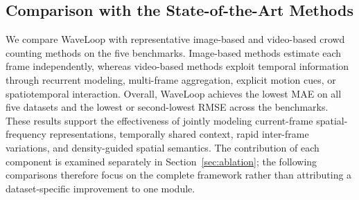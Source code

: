 \documentclass[lettersize,journal]{IEEEtran}
\begin{document}
\subsection{Comparison with the State-of-the-Art Methods}
We compare WaveLoop with representative image-based and video-based crowd counting methods on the five benchmarks. Image-based methods estimate each frame independently, whereas video-based methods exploit temporal information through recurrent modeling, multi-frame aggregation, explicit motion cues, or spatiotemporal interaction. Overall, WaveLoop achieves the lowest MAE on all five datasets and the lowest or second-lowest RMSE across the benchmarks. These results support the effectiveness of jointly modeling current-frame spatial-frequency representations, temporally shared context, rapid inter-frame variations, and density-guided spatial semantics. The contribution of each component is examined separately in Section~\ref{sec:ablation}; the following comparisons therefore focus on the complete framework rather than attributing a dataset-specific improvement to one module.
\end{document}
